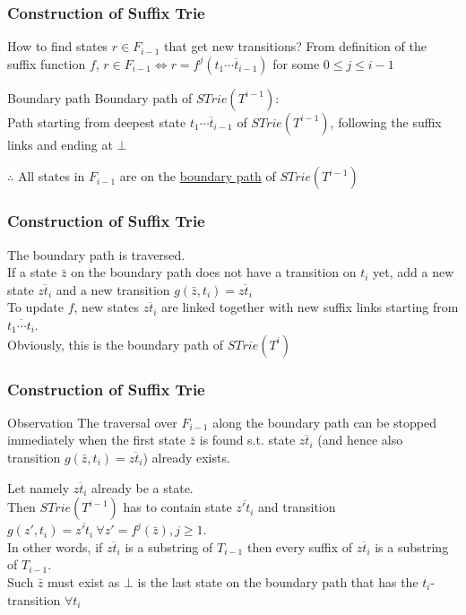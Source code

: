 \documentclass[compress,usenames,dvipsnames]{beamer}
\newenvironment{definitionblock}[1]{
    \setbeamercolor{block title}{bg=cyan}
    \begin{block}{#1}}{\end{block}
}
\begin{document}
\begin{frame} \frametitle{Construction of Suffix Trie}
    How to find states $r \in F_{i-1}$ that get new transitions?
    \hfill \break
    \hfill \break
    From definition of the suffix function $f$,
    \hfill \break
    $r \in F_{i-1} \Leftrightarrow r = f^j (\overline{t_1\cdots t_{i-1}})$ for some $ 0 \leq j \leq i - 1$
    \begin{definitionblock}{Boundary path}
        Boundary path of $STrie(T^{i-1})$: \\
        Path starting from deepest state $\overline{t_1\cdots t_{i-1}}$ of $STrie(T^{i-1})$, following the suffix links and ending at $\bot$
    \end{definitionblock}
    $\therefore $ All states in $F_{i-1}$ are on the \underline{boundary path} of $STrie(T^{i-1})$
\end{frame}

\begin{frame} \frametitle{Construction of Suffix Trie}
    The boundary path is traversed. \\
    \hfill \break
    If a state $\bar{z}$ on the boundary path does not have a transition on $t_i$ yet,
    add a new state $\overline{zt_i}$ and a new transition $g(\bar{z}, t_i) = \overline{zt_i}$ \\
    \hfill \break
    To update $f$, new states $\overline{zt_i}$ are linked together with new suffix links starting from $\overline{t_1\cdots t_{i}}$. \\
    Obviously, this is the boundary path of $STrie(T^i)$
\end{frame}

\begin{frame} \frametitle{Construction of Suffix Trie}
    \begin{block}{Observation}
        The traversal over $F_{i-1}$ along the boundary path can be stopped immediately when the first state $\bar{z}$ is found s.t. state $\overline{zt_i}$ (and hence also transition $g(\bar{z}, t_i) = \overline{zt_i}$) already exists.
    \end{block}
    Let namely $\overline{zt_i}$ already be a state. \\
    \hfill \break
    Then $STrie(T^{i-1})$ has to contain state $\overline{z't_i}$ and transition $g(z', t_i) = \overline{z't_i} \ \forall z' = f^j(\bar{z}), j \geq 1$. \\
    In other words, if $\overline{zt_i}$ is a substring of $T_{i-1}$ then every suffix of $\overline{zt_i}$ is a substring of $T_{i-1}$.\\
    \hfill \break
    Such $\bar{z}$ must exist as $\bot$ is the last state on the boundary path that has the $t_i$-transition $\forall t_i$
\end{frame}
\end{document}
